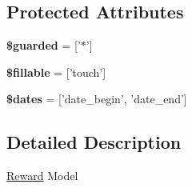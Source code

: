 \subsection*{Protected Attributes}
\begin{DoxyCompactItemize}
\item 
\hypertarget{classDMA_1_1Friends_1_1Models_1_1Reward_ad1df3ebe52db8869899e29a8de5cd70d}{{\bfseries \$guarded} = \mbox{[}'$\ast$'\mbox{]}}\label{classDMA_1_1Friends_1_1Models_1_1Reward_ad1df3ebe52db8869899e29a8de5cd70d}

\item 
\hypertarget{classDMA_1_1Friends_1_1Models_1_1Reward_ae268c0f08d1cccacf8655b5028739c87}{{\bfseries \$fillable} = \mbox{[}'touch'\mbox{]}}\label{classDMA_1_1Friends_1_1Models_1_1Reward_ae268c0f08d1cccacf8655b5028739c87}

\item 
\hypertarget{classDMA_1_1Friends_1_1Models_1_1Reward_acbc452b5aadbb75acadf961a85bbc448}{{\bfseries \$dates} = \mbox{[}'date\-\_\-begin', 'date\-\_\-end'\mbox{]}}\label{classDMA_1_1Friends_1_1Models_1_1Reward_acbc452b5aadbb75acadf961a85bbc448}

\end{DoxyCompactItemize}


\subsection{Detailed Description}
\hyperlink{classDMA_1_1Friends_1_1Models_1_1Reward}{Reward} Model 


